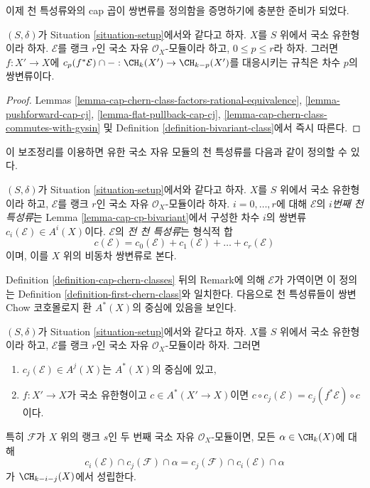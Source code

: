 \noindent
이제 천 특성류와의 cap 곱이 쌍변류를 정의함을 증명하기에 충분한
준비가 되었다.

\begin{lemma}
\label{lemma-cap-cp-bivariant}
$(S, \delta)$가 Situation \ref{situation-setup}에서와 같다고 하자.
$X$를 $S$ 위에서 국소 유한형이라 하자. $\mathcal{E}$를 랭크 $r$인
국소 자유 $\mathcal{O}_X$-모듈이라 하고, $0 \leq p \leq r$라 하자.
그러면 $f : X' \to X$에
$c_p(f^*\mathcal{E}) \cap - : \CH_k(X') \to \CH_{k - p}(X')$를
대응시키는 규칙은 차수 $p$의 쌍변류이다.
\end{lemma}

\begin{proof}
Lemmas
\ref{lemma-cap-chern-class-factors-rational-equivalence},
\ref{lemma-pushforward-cap-cj},
\ref{lemma-flat-pullback-cap-cj},
\ref{lemma-cap-chern-class-commutes-with-gysin} 및 Definition
\ref{definition-bivariant-class}에서 즉시 따른다.
\end{proof}

\noindent
이 보조정리를 이용하면 유한 국소 자유 모듈의 천 특성류를 다음과 같이
정의할 수 있다.

\begin{definition}
\label{definition-chern-classes-final}
$(S, \delta)$가 Situation \ref{situation-setup}에서와 같다고 하자.
$X$를 $S$ 위에서 국소 유한형이라 하고, $\mathcal{E}$를 랭크 $r$인
국소 자유 $\mathcal{O}_X$-모듈이라 하자. $i = 0, \ldots, r$에 대해
$\mathcal{E}$의 {\it $i$번째 천 특성류}는 Lemma
\ref{lemma-cap-cp-bivariant}에서 구성한 차수 $i$의 쌍변류
$c_i(\mathcal{E}) \in A^i(X)$이다. $\mathcal{E}$의
{\it 전 천 특성류}는 형식적 합
$$
c(\mathcal{E}) = 
c_0(\mathcal{E}) + c_1(\mathcal{E}) + \ldots + c_r(\mathcal{E})
$$
이며, 이를 $X$ 위의 비동차 쌍변류로 본다.
\end{definition}

\noindent
Definition \ref{definition-cap-chern-classes} 뒤의 Remark에 의해
$\mathcal{E}$가 가역이면 이 정의는 Definition
\ref{definition-first-chern-class}와 일치한다. 다음으로 천 특성류들이
쌍변 Chow 코호몰로지 환 $A^*(X)$의 중심에 있음을 보인다.

\begin{lemma}
\label{lemma-cap-commutative-chern}
$(S, \delta)$가 Situation \ref{situation-setup}에서와 같다고 하자.
$X$를 $S$ 위에서 국소 유한형이라 하고, $\mathcal{E}$를 랭크 $r$인
국소 자유 $\mathcal{O}_X$-모듈이라 하자. 그러면
\begin{enumerate}
\item $c_j(\mathcal{E}) \in A^j(X)$는 $A^*(X)$의 중심에 있고,
\item $f : X' \to X$가 국소 유한형이고 $c \in A^*(X' \to X)$이면
$c \circ c_j(\mathcal{E}) = c_j(f^*\mathcal{E}) \circ c$이다.
\end{enumerate}
특히 $\mathcal{F}$가 $X$ 위의 랭크 $s$인 두 번째 국소 자유
$\mathcal{O}_X$-모듈이면, 모든 $\alpha \in \CH_k(X)$에 대해
$$
c_i(\mathcal{E}) \cap c_j(\mathcal{F}) \cap \alpha
=
c_j(\mathcal{F}) \cap c_i(\mathcal{E}) \cap \alpha
$$
가 $\CH_{k - i - j}(X)$에서 성립한다.
\end{lemma}

